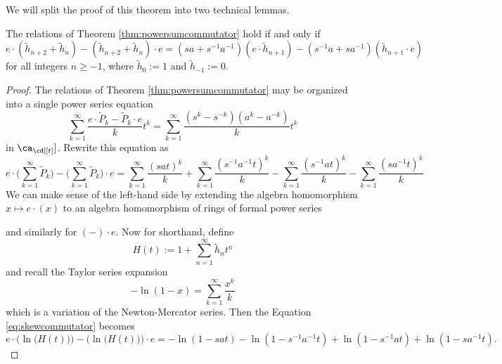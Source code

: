 We will split the proof of this theorem into two technical lemmas.

\begin{lemma} \label{lem:powersumcommutator1}
The relations of Theorem \ref{thm:powersumcommutator} hold if and only if 
\begin{equation} \label{eq:skewcommutator}
e \cdot (\tilde{h}_{n+2} + \tilde{h}_n) - (\tilde{h}_{n+2} + \tilde{h}_n) \cdot e = (sa + s^{-1}a^{-1}) (e \cdot \tilde{h}_{n+1}) - (s^{-1}a + sa^{-1}) (\tilde{h}_{n+1} \cdot e)
\end{equation}
for all integers $n \geq -1$, where $\tilde{h}_0 := 1$ and $\tilde{h}_{-1} := 0$.
\end{lemma}
\begin{proof}
The relations of Theorem \ref{thm:powersumcommutator} may be organized into a single power series equation
\begin{equation} \label{eq:skewcommutator}
\sum_{k=1}^\infty \frac{e \cdot \tilde{P}_k - \tilde{P}_k \cdot e}{k} t^k = \sum_{k=1}^{\infty} \frac {(s^k - s^{-k}) (a^k - a^{-k})}{k} t^k
\end{equation}
in $\ca_\cd [[t]]$. Rewrite this equation as
\begin{equation} \label{eq:powersumcommutator2} 
e \cdot \Bigg( \sum_{k=1}^\infty \tilde{P}_k \Bigg) - \Bigg( \sum_{k=1}^\infty \tilde{P}_k \Bigg) \cdot e = \sum_{k=1}^{\infty} \frac {(sat)^k}{k} + \sum_{k=1}^{\infty} \frac {(s^{-1}a^{-1}t)^k}{k} - \sum_{k=1}^{\infty} \frac {(s^{-1}at)^k}{k} - \sum_{k=1}^{\infty} \frac {(sa^{-1}t)^k}{k}
\end{equation}
We can make sense of the left-hand side by extending the algebra homomorphism $x \mapsto e \cdot (x)$ to an algebra homomorphism of rings of formal power series
\begin{center}
\end{center}
and similarly for $(-) \cdot e$. Now for shorthand, define 
\[
H(t) := 1 + \sum_{n=1}^\infty \tilde{h}_n t^n
\]
and recall the Taylor series expansion
\[
-\ln(1-x) = \sum_{k=1}^\infty \frac{x^k}{k}
\]
which is a variation of the Newton-Mercator series. Then the Equation \eqref{eq:skewcommutator} becomes
\begin{equation} \label{eq:powersumcommutator3} 
e \cdot \Big( \ln\big(H(t)\big) \Big) - \Big( \ln \big(H(t)\big) \Big) \cdot e = - \ln(1 - sat) - \ln(1 - s^{-1}a^{-1}t) + \ln(1 - s^{-1}at) + \ln(1 - sa^{-1}t).

\end{equation}
\end{proof}
